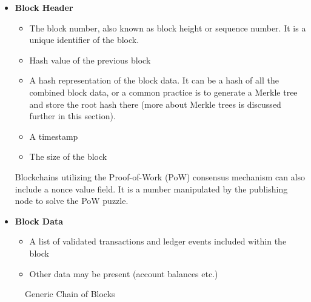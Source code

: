 \begin{itemize}
    \item \textbf{Block Header}
    \begin{itemize}
        \item The block number, also known as block height or sequence number. It is a unique identifier of the block.
        \item Hash value of the previous block
        \item A hash representation of the block data. It can be a hash of all the combined block data, or a common practice is to generate a Merkle tree and store the root hash there (more about Merkle trees is discussed further in this section).
        \item A timestamp
        \item The size of the block
    \end{itemize}
    Blockchains utilizing the Proof-of-Work (PoW) consensus mechanism can also include a nonce value field. It is a number manipulated by the publishing node to solve the PoW puzzle. 
    \item \textbf{Block Data}
    \begin{itemize}
        \item A list of validated transactions and ledger events included within the block
        \item Other data may be present (account balances etc.)
    \end{itemize}
\end{itemize}


\begin{figure}[h]
    \begin{center}
    \end{center}
    \caption{Generic Chain of Blocks \cite{bc.technology.overview}}
    \label{figure:bc.block}
\end{figure}


